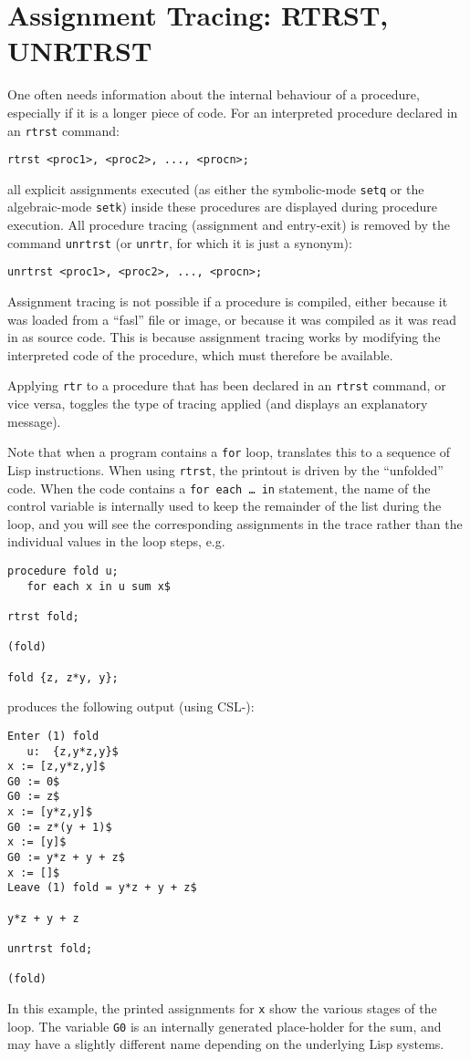 \section{Assignment Tracing: RTRST, UNRTRST}

\hypertarget{command:RTRST}{}
\hypertarget{command:UNRTRST}{}
One often needs information about the internal behaviour of a
procedure, especially if it is a longer piece of code.  For an
interpreted procedure declared in an \texttt{rtrst} command:
\begin{verbatim}
rtrst <proc1>, <proc2>, ..., <procn>;
\end{verbatim}
all explicit assignments executed (as either the symbolic-mode
\texttt{setq} or the algebraic-mode \texttt{setk})
inside these procedures are displayed during procedure execution.  All
procedure tracing (assignment and entry-exit) is removed by the
command \texttt{unrtrst} (or \texttt{unrtr}, for which it is just a
synonym):
\begin{verbatim}
unrtrst <proc1>, <proc2>, ..., <procn>;
\end{verbatim}
Assignment tracing is not possible if a procedure is compiled, either
because it was loaded from a ``fasl'' file or image, or because it was
compiled as it was read in as source code.  This is because assignment
tracing works by modifying the interpreted code of the procedure,
which must therefore be available.

Applying \texttt{rtr} to a procedure that has been declared in an
\texttt{rtrst} command, or vice versa, toggles the type of tracing
applied (and displays an explanatory message).

Note that when a program contains a \texttt{for} loop, \REDUCE{}
translates this to a sequence of Lisp instructions.  When using
\texttt{rtrst}, the printout is driven by the ``unfolded'' code.  When
the code contains a \texttt{for each \ldots{} in} statement, the name
of the control variable is internally used to keep the remainder of
the list during the loop, and you will see the corresponding
assignments in the trace rather than the individual values in the loop
steps, e.g.
\begin{verbatim}
procedure fold u;
   for each x in u sum x$

rtrst fold;

(fold)

fold {z, z*y, y};
\end{verbatim}
produces the following output (using CSL-\REDUCE{}):
\begin{verbatim}
Enter (1) fold
   u:  {z,y*z,y}$
x := [z,y*z,y]$
G0 := 0$
G0 := z$
x := [y*z,y]$
G0 := z*(y + 1)$
x := [y]$
G0 := y*z + y + z$
x := []$
Leave (1) fold = y*z + y + z$

y*z + y + z

unrtrst fold;

(fold)
\end{verbatim}
In this example, the printed assignments for \texttt{x} show the
various stages of the loop.  The variable \texttt{G0} is an internally
generated place-holder for the sum, and may have a slightly different
name depending on the underlying Lisp systems.

